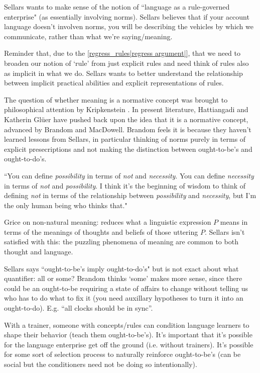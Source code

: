 Sellars wants to make sense of the notion of ``language as a rule-governed enterprise" (as essentially involving norms). Sellars believes that if your account language doesn't involven norms, you will be describing the vehicles by which we communicate, rather than what we're saying/meaning.

Reminder that, due to the \ref{regress_rules|regress argument|}, that we need to broaden our notion of `rule' from just explicit rules and need think of rules also as implicit in what we do. Sellars wants to better understand the relationship between implicit practical abilities and explicit representations of rules.

The question of whether meaning is a normative concept was brought to philosophical attention by Kripkenstein \cite{kripke1982wittgenstein}. In present literature, Hattiangadi and Katherin Gl{\"u}er have pushed back upon the idea that it is a normative concept, advanced by Brandom and MacDowell. Brandom feels it is because they haven't learned lessons from Sellars, in particular thinking of norms purely in terms of explicit presecriptions and not making the distinction between ought-to-be's and ought-to-do's.

``You can define \emph{possibility} in terms of \emph{not} and \emph{necessity}. You can define \emph{necessity} in terms of \emph{not} and \emph{possibility}. I think it's the beginning of wisdom to think of defining \emph{not} in terms of the relationship between \emph{possibility} and \emph{necessity}, but I'm the only human being who thinks that."

Grice on non-natural meaning: reduces what a linguistic expression $P$ means in terms of the meanings of thoughts and beliefs of those uttering $P$. Sellars isn't satisfied with this: the puzzling phenomena of meaning are common to both thought and language.

Sellars says ``ought-to-be's imply ought-to-do's" but is not exact about what quantifier: all or some? Brandom thinks `some' makes more sense, since there could be an ought-to-be requiring a state of affairs to change without telling us who has to do what to fix it (you need auxillary hypotheses to turn it into an ought-to-do). E.g. ``all clocks should be in sync''.

With a trainer, someone with concepts/rules can condition language learners to shape their behavior (teach them ought-to-be's). It's important that it's possible for the language enterprise get off the ground (i.e. without trainers). It's possible for some sort of selection process to naturally reinforce ought-to-be's (can be social but the conditioners need not be doing so intentionally).

